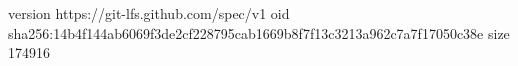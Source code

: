 version https://git-lfs.github.com/spec/v1
oid sha256:14b4f144ab6069f3de2cf228795cab1669b8f7f13c3213a962c7a7f17050c38e
size 174916
